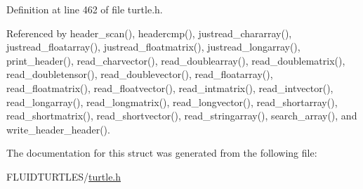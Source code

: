 Definition at line 462 of file turtle.\-h.



Referenced by header\-\_\-scan(), headercmp(), justread\-\_\-chararray(), justread\-\_\-floatarray(), justread\-\_\-floatmatrix(), justread\-\_\-longarray(), print\-\_\-header(), read\-\_\-charvector(), read\-\_\-doublearray(), read\-\_\-doublematrix(), read\-\_\-doubletensor(), read\-\_\-doublevector(), read\-\_\-floatarray(), read\-\_\-floatmatrix(), read\-\_\-floatvector(), read\-\_\-intmatrix(), read\-\_\-intvector(), read\-\_\-longarray(), read\-\_\-longmatrix(), read\-\_\-longvector(), read\-\_\-shortarray(), read\-\_\-shortmatrix(), read\-\_\-shortvector(), read\-\_\-stringarray(), search\-\_\-array(), and write\-\_\-header\-\_\-header().



The documentation for this struct was generated from the following file\-:\begin{DoxyCompactItemize}
\item 
F\-L\-U\-I\-D\-T\-U\-R\-T\-L\-E\-S/\hyperlink{turtle_8h}{turtle.\-h}\end{DoxyCompactItemize}
